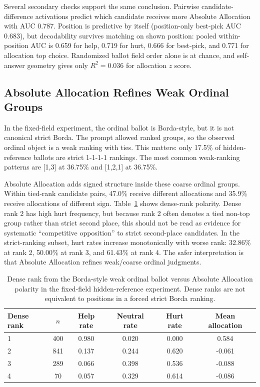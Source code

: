 \documentclass[11pt]{article}
\begin{document}
Several secondary checks support the same conclusion. Pairwise
candidate-difference activations predict which candidate receives more
Absolute Allocation with AUC 0.787. Position is predictive by itself
(position-only best-pick AUC 0.683), but decodability survives matching on
shown position: pooled within-position AUC is 0.659 for help, 0.719 for hurt,
0.666 for best-pick, and 0.771 for allocation top choice. Randomized ballot
field order alone is at chance, and self-answer geometry gives only
$R^2=0.036$ for allocation $z$ score.

\subsection{Absolute Allocation Refines Weak Ordinal Groups}

In the fixed-field experiment, the ordinal ballot is Borda-style, but it is not canonical
strict Borda. The prompt allowed ranked groups, so the observed ordinal object
is a weak ranking with ties. This matters: only 17.5\% of hidden-reference
ballots are strict 1-1-1-1 rankings. The most common weak-ranking patterns are
[1,3] at 36.75\% and [1,2,1] at 36.75\%.

Absolute Allocation adds signed structure inside these coarse ordinal groups.
Within tied-rank candidate pairs, 47.0\% receive different allocations and
35.9\% receive allocations of different sign. Table~\ref{tab:rankpolarity}
shows dense-rank polarity. Dense rank 2 has high hurt frequency, but because
rank 2 often denotes a tied non-top group rather than strict second place, this
should not be read as evidence for systematic ``competitive opposition'' to
strict second-place candidates. In the strict-ranking subset, hurt rates
increase monotonically with worse rank: 32.86\% at rank 2, 50.00\% at rank 3,
and 61.43\% at rank 4. The safer interpretation is that Absolute Allocation
refines weak/coarse ordinal judgments.

\begin{table}[h]
\centering
\begin{tabular}{lccccc}
\toprule
Dense rank & $n$ & Help rate & Neutral rate & Hurt rate & Mean allocation \\
\midrule
1 & 400 & 0.980 & 0.020 & 0.000 & 0.584 \\
2 & 841 & 0.137 & 0.244 & 0.620 & -0.061 \\
3 & 289 & 0.066 & 0.398 & 0.536 & -0.088 \\
4 & 70 & 0.057 & 0.329 & 0.614 & -0.086 \\
\bottomrule
\end{tabular}
\caption{Dense rank from the Borda-style weak ordinal ballot versus Absolute
Allocation polarity in the fixed-field hidden-reference experiment. Dense ranks are not
equivalent to positions in a forced strict Borda ranking.}
\label{tab:rankpolarity}
\end{table}
\end{document}
